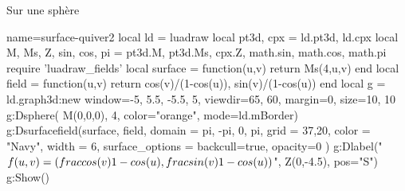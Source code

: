 \begin{demo}{Sur une sphère}
\begin{luadraw}{name=surface-quiver2}
local ld = luadraw
local pt3d, cpx = ld.pt3d, ld.cpx
local M, Ms, Z, sin, cos, pi = pt3d.M, pt3d.Ms, cpx.Z, math.sin, math.cos, math.pi
require 'luadraw_fields'
local surface = function(u,v) return Ms(4,u,v) end
local field = function(u,v) return {cos(v)/(1-cos(u)), sin(v)/(1-cos(u))} end
local g = ld.graph3d:new{ window={-5, 5.5, -5.5, 5}, viewdir={65, 60}, margin=0, size={10, 10} }
g:Dsphere( M(0,0,0), 4, {color="orange", mode=ld.mBorder})
g:Dsurfacefield(surface, field, {
    domain = {pi, -pi, 0, pi},
    grid = {37,20},
    color = "Navy",
    width = 6,
    surface_options = {backcull=true, opacity=0}
    })
g:Dlabel("$f(u,v)= (\\frac{\\cos(v)}{1-\\cos(u)},\\frac{\\sin(v)}{1-\\cos(u)})$", Z(0,-4.5), {pos="S"})
g:Show()
\end{luadraw}
\end{demo}
